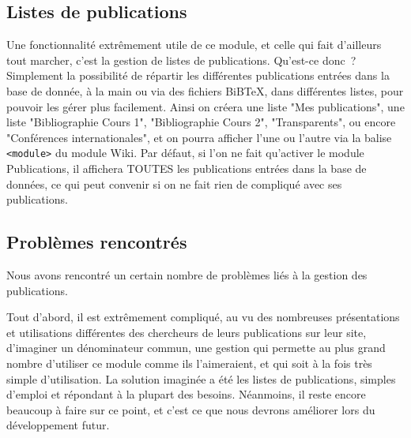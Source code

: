 \documentclass[final,11pt,a4paper,twoside,titlepage]{article}
\newcommand{\p}{\vspace{0.3em}}
\newcommand{\code}[1]{\texttt{#1}}
\begin{document}
{    \subsection{Listes de publications}
    Une fonctionnalité extrêmement utile de ce module, et celle qui fait d'ailleurs
    tout marcher, c'est la gestion de listes de publications. Qu'est-ce donc~? 
    Simplement la possibilité de répartir les différentes publications entrées dans
    la base de donnée, à la main ou via des fichiers BiBTeX, dans différentes listes,
    pour pouvoir les gérer plus facilement. Ainsi on créera une liste "Mes publications",
    une liste "Bibliographie Cours 1", "Bibliographie Cours 2", "Transparents", ou encore
    "Conférences internationales", et on pourra afficher l'une ou l'autre via la balise
    \code{<module>} du module Wiki. Par défaut, si l'on ne fait qu'activer le module
    Publications, il affichera TOUTES les publications entrées dans la base de données,
    ce qui peut convenir si on ne fait rien de compliqué avec ses publications.

    \subsection{Problèmes rencontrés}
    Nous avons rencontré un certain nombre de problèmes liés à la gestion des publications. \p
    
    Tout d'abord, il est extrêmement compliqué, au vu des nombreuses présentations et 
    utilisations différentes des chercheurs de leurs publications sur leur site, d'imaginer
    un dénominateur commun, une gestion qui permette au plus grand nombre d'utiliser ce 
    module comme ils l'aimeraient, et qui soit à la fois très simple d'utilisation. La 
    solution imaginée a été les listes de publications, simples d'emploi et répondant
    à la plupart des besoins. Néanmoins, il reste encore beaucoup à faire sur ce point,
    et c'est ce que nous devrons améliorer lors du développement futur. \p

}
\end{document}
